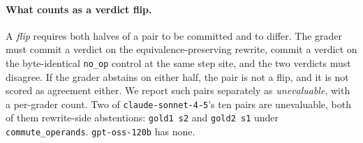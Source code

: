\paragraph{What counts as a verdict flip.}
A \emph{flip} requires both halves of a pair to be committed and to differ. The
grader must commit a verdict on the equivalence-preserving rewrite, commit a
verdict on the byte-identical \texttt{no\_op} control at the same step site,
and the two
verdicts must disagree. If the grader abstains on either half, the pair is not
a flip, and it is not scored as agreement either. We report such pairs
separately as \emph{unevaluable}, with a per-grader count.
Two of \texttt{claude-sonnet-4-5}'s ten pairs are unevaluable, both of them
rewrite-side abstentions: \texttt{gold1 s2} and \texttt{gold2 s1} under
\texttt{commute\_operands}. \texttt{gpt-oss-120b} has none.
